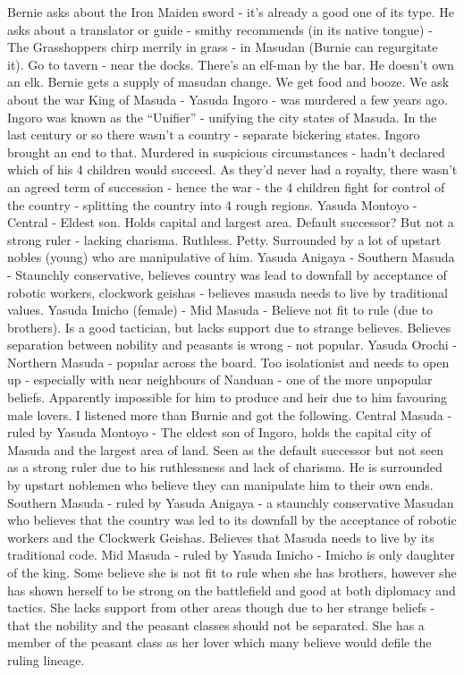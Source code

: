 Bernie asks about the Iron Maiden sword - it’s already a good one of its type. He asks about a translator or guide - smithy recommends (in its native tongue) - The Grasshoppers chirp merrily in grass - in Masudan (Burnie can regurgitate it).\medskip
Go to tavern - near the docks. There’s an elf-man by the bar. He doesn’t own an elk.\medskip
Bernie gets a supply of masudan change. We get food and booze. We ask about the war\medskip
King of Masuda - Yasuda Ingoro - was murdered a few years ago. Ingoro was known as the “Unifier” - unifying the city states of Masuda. In the last century or so there wasn’t a country - separate bickering states. Ingoro brought an end to that. Murdered in suspicious circumstances - hadn’t declared which of his 4 children would succeed. As they’d never had a royalty, there wasn’t an agreed term of succession - hence the war - the 4 children fight for control of the country - splitting the country into 4 rough regions.\medskip
Yasuda Montoyo - Central - Eldest son. Holds capital and largest area. Default successor? But not a strong ruler - lacking charisma. Ruthless. Petty. Surrounded by a lot of upstart nobles (young) who are manipulative of him.\medskip
Yasuda Anigaya - Southern Masuda - Staunchly conservative, believes country was lead to downfall by acceptance of robotic workers, clockwork geishas - believes masuda needs to live by traditional values.\medskip
Yasuda Imicho (female) - Mid Masuda - Believe not fit to rule (due to brothers). Is a good tactician, but lacks support due to strange believes. Believes separation between nobility and peasants is wrong - not popular.\medskip
Yasuda Orochi - Northern Masuda - popular across the board. Too isolationist and needs to open up - especially with near neighbours of Nanduan - one of the more unpopular beliefs. Apparently impossible for him to produce and heir due to him favouring male lovers.\medskip
I listened more than Burnie and got the following.\medskip
Central Masuda - ruled by Yasuda Montoyo - The eldest son of Ingoro, holds the capital city of Masuda and the largest area of land. Seen as the default successor but not seen as a strong ruler due to his ruthlessness and lack of charisma. He is surrounded by upstart noblemen who believe they can manipulate him to their own ends.\medskip
Southern Masuda - ruled by Yasuda Anigaya - a staunchly conservative Masudan who believes that the country was led to its downfall by the acceptance of robotic workers and the Clockwerk Geishas. Believes that Masuda needs to live by its traditional code.\medskip
Mid Masuda - ruled by Yasuda Imicho - Imicho is only daughter of the king. Some believe she is not fit to rule when she has brothers, however she has shown herself to be strong on the battlefield and good at both diplomacy and tactics. She lacks support from other areas though due to her strange beliefs - that the nobility and the peasant classes should not be separated. She has a member of the peasant class as her lover which many believe would defile the ruling lineage.\medskip
